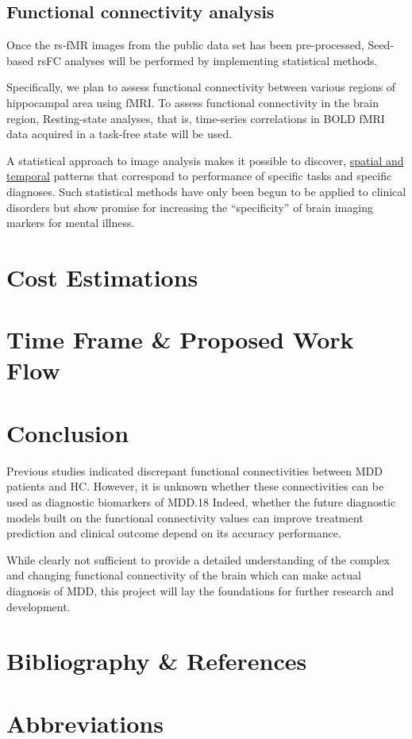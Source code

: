 \documentclass{article}
\begin{document}

\subsection{Functional connectivity analysis}

Once the rs-fMR images from the public data set has been
pre-processed, Seed- based rsFC analyses will be performed by
implementing statistical methods.

Specifically, we plan to assess functional connectivity between
various regions of hippocampal area using fMRI. To assess functional
connectivity in the brain region, Resting-state analyses, that is,
time-series correlations in BOLD fMRI data acquired in a task-free
state will be used.

A statistical approach to image analysis makes it possible to
discover, \underline{spatial and temporal} patterns that correspond to
performance of specific tasks and specific diagnoses. Such statistical
methods have only been begun to be applied to clinical disorders but
show promise for increasing the ``specificity'' of brain imaging
markers for mental illness.

\newpage

\section{Cost Estimations}
\section{Time Frame \& Proposed Work Flow}
\section{Conclusion}

Previous studies indicated discrepant functional connectivities
between MDD patients and HC. However, it is unknown whether these
connectivities can be used as diagnostic biomarkers of MDD.18 Indeed,
whether the future diagnostic models built on the functional
connectivity values can improve treatment prediction and clinical
outcome depend on its accuracy performance.

While clearly not sufficient to provide a detailed understanding of
the complex and changing functional connectivity of the brain which
can make actual diagnosis of MDD, this project will lay the
foundations for further research and development.

\section{Bibliography \& References}

\section*{Abbreviations}
\end{document}

